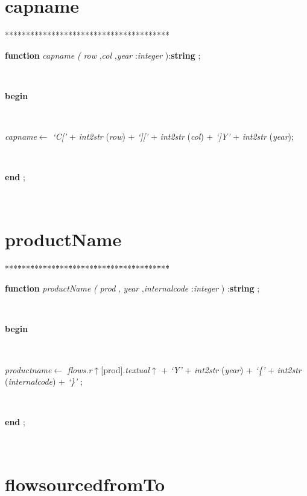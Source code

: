 \documentclass[10pt, a4paper]{article}
\begin{document}
\section{capname}\label{sec:harmonyplancapname}

\begin{tabbing}
***\=***\=***\=***\=***\=***\=***\=***\=***\=***\=***\=***\=***\=\kill
\parbox{14cm}{\textsf{\textbf{function}  \textit{capname} \textit{(} \textit{row} ,\textit{col} ,\textit{year} :\textit{integer} ):\textbf{string} ;}}\\
\+\parbox{14cm}{\textsf{\textbf{begin} }}\\
\parbox{14cm}{\textsf{\textit{capname}$\leftarrow$ \textit{\textrm{\textup { `C[' } }} + \textit{int2str} (\textit{row}) + \textit{\textrm{\textup { `][' } }} + \textit{int2str} (\textit{col}) + \textit{\textrm{\textup { `]Y' } }} + \textit{int2str} (\textit{year})}; }\\
\<\-\parbox{14cm}{\textsf{\textbf{end} ;}}\\
\end{tabbing}
\section{productName}\label{sec:harmonyplanproductName}

\begin{tabbing}
***\=***\=***\=***\=***\=***\=***\=***\=***\=***\=***\=***\=***\=\kill
\parbox{14cm}{\textsf{\textbf{function}  \textit{productName} \textit{(} \textit{prod} ,  \textit{year} ,\textit{internalcode} :\textit{integer} ) :\textbf{string} ;}}\\
\+\parbox{14cm}{\textsf{\textbf{begin} }}\\
\parbox{14cm}{\textsf{\textit{productname}$\leftarrow$ \textit{flows.r}$\uparrow$\textit{}[prod].\textit{textual}$\uparrow$ +  \textit{\textrm{\textup { `Y' } }} + \textit{int2str} (\textit{year}) + \textit{\textrm{\textup { `\{' } }} + \textit{int2str} (\textit{internalcode}) + \textit{\textrm{\textup { `\}' } }} }; }\\
\<\-\parbox{14cm}{\textsf{\textbf{end} ;}}\\
\end{tabbing}
\section{flowsourcedfromTo}\label{sec:harmonyplanflowsourcedfromTo}
\end{document}
